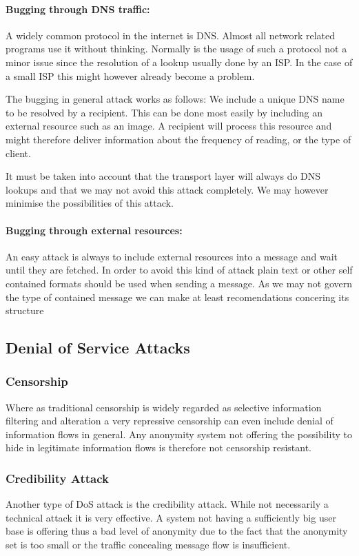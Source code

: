 \paragraph{Bugging through DNS traffic:} A widely common protocol in the internet is DNS. Almost all network related programs use it without thinking. Normally is the usage of such a protocol not a minor issue since the resolution of a lookup usually done by an ISP. In the case of a small ISP this might however already become a problem.

The bugging in general attack works as follows: We include a unique DNS name to be resolved by a recipient. This can be done most easily by including an external resource such as an image. A recipient will process this resource and might therefore deliver information about the frequency of reading, or the type of client. 

It must be taken into account that the transport layer will always do DNS lookups and that we may not avoid this attack completely. We may however minimise the possibilities of this attack.

\paragraph{Bugging through external resources:} An easy attack is always to include external resources into a message and wait until they are fetched. In order to avoid this kind of attack plain text or other self contained formats should be used when sending a message. As we may not govern the type of contained message we can make at least recomendations concering its structure

\subsection{Denial of Service Attacks}
\subsubsection{Censorship}
Where as traditional censorship is widely regarded as selective information filtering and alteration a very repressive censorship can even include denial of information flows in general. Any anonymity system not offering the possibility to hide in legitimate information flows is therefore not censorship resistant.

\subsubsection{Credibility Attack}
Another type of DoS attack is the credibility attack. While not necessarily a technical attack it is very effective. A system not having a sufficiently big user base is offering thus a bad level of anonymity due to the fact that the anonymity set is too small or the traffic concealing message flow is insufficient. 


